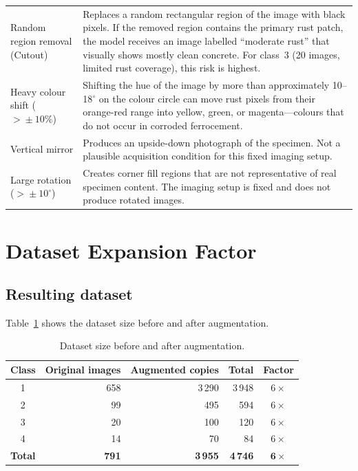\documentclass[11pt,a4paper]{article}
\begin{document}
\begin{longtable}{L{3.2cm} L{11.2cm}}
  Random region removal (Cutout)
    & Replaces a random rectangular region of the image with black pixels. If
      the removed region contains the primary rust patch, the model receives an
      image labelled ``moderate rust'' that visually shows mostly clean
      concrete. For class~3 (20 images, limited rust coverage), this risk is
      highest. \\[6pt]

  Heavy colour shift ($>{}\pm10\%$)
    & Shifting the hue of the image by more than approximately 10--18$^\circ$
      on the colour circle can move rust pixels from their orange-red range into
      yellow, green, or magenta---colours that do not occur in corroded
      ferrocement. \\[6pt]

  Vertical mirror
    & Produces an upside-down photograph of the specimen. Not a plausible
      acquisition condition for this fixed imaging setup. \\[6pt]

  Large rotation ($>{}\pm10^\circ$)
    & Creates corner fill regions that are not representative of real specimen
      content. The imaging setup is fixed and does not produce rotated images.
\end{longtable}

\section{Dataset Expansion Factor}
\label{sec:expansion}

\subsection*{Resulting dataset}

Table~\ref{tab:expansion} shows the dataset size before and after augmentation.

\begin{table}[htbp]
  \centering
  \caption{Dataset size before and after augmentation.}
  \label{tab:expansion}
  \begin{tabular}{crrrc}
    \toprule
    \textbf{Class} & \textbf{Original images} & \textbf{Augmented copies}
      & \textbf{Total} & \textbf{Factor} \\
    \midrule
    1 &   658 &  3\,290 &  3\,948 & $6\times$ \\
    2 &    99 &    495  &    594  & $6\times$ \\
    3 &    20 &    100  &    120  & $6\times$ \\
    4 &    14 &     70  &     84  & $6\times$ \\
    \midrule
    \textbf{Total} & \textbf{791} & \textbf{3\,955} & \textbf{4\,746}
      & $\mathbf{6\times}$ \\
    \bottomrule
  \end{tabular}
\end{table}
\end{document}
